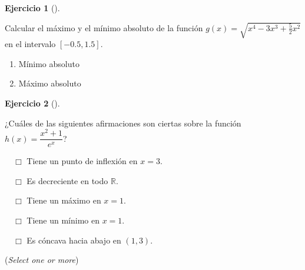 \documentclass[
  a4paper,
]{scrreport}
\theoremstyle{definition}
\newtheorem{exercise}{Ejercicio}[chapter]
\theoremstyle{remark}
\begin{document}
\begin{exercise}[]\protect\hypertarget{exr-extremos-absolutos}{}\label{exr-extremos-absolutos}

Calcular el máximo y el mínimo absoluto de la función
\(g(x)=\sqrt{x^4-3x^3+\frac{5}{2}x^2}\) en el intervalo \([-0.5,1.5]\).

\begin{enumerate}
\def\labelenumi{\alph{enumi}.}
\item
  Mínimo absoluto

  \vspace{18pt}
\item
  Máximo absoluto

  \vspace{18pt}
\end{enumerate}

\end{exercise}

\begin{exercise}[]\protect\hypertarget{exr-extremos-puntos-inflexion}{}\label{exr-extremos-puntos-inflexion}

¿Cuáles de las siguientes afirmaciones son ciertas sobre la función
\(h(x)=\dfrac{x^2+1}{e^x}\)?

${\quad\Box}$ Tiene un punto de inflexión en $x=3$.

${\quad\Box}$ Es decreciente en todo $\mathbb{R}$.

${\quad\Box}$ Tiene un máximo en $x=1$.

${\quad\Box}$ Tiene un mínimo en $x=1$.

${\quad\Box}$ Es cóncava hacia abajo en $(1,3)$.

(\emph{Select one or more})

\end{exercise}
\end{document}
